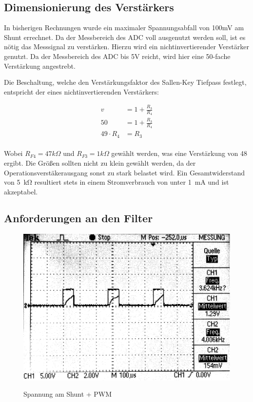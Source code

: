 \subsection{Dimensionierung des Verstärkers}

In bisherigen Rechnungen wurde ein maximaler Spannungsabfall von 100mV am Shunt errechnet. Da der Messbereich des ADC voll ausgenutzt werden soll,
ist es nötig das Messsignal zu verstärken. Hierzu wird ein nichtinvertierender Verstärker genutzt. Da der Messbereich des ADC bis 5V reicht, wird hier eine 
50-fache Verstärkung angestrebt.

Die Beschaltung, welche den Verstärkungsfaktor des Sallen-Key Tiefpass festlegt, entspricht der eines nichtinvertierenden Verstärkers:

\begin{align*}
v &= 1 + \frac{R_{3}}{R_{4}}\\
50 &= 1 + \frac{R_{3}}{R_{4}}\\
49\cdot R_{4} &= R_{3}
\end{align*}
\\
Wobei $R_{F4} = 47 k\Omega$ und $R_{F3} = 1 k\Omega$  gewählt werden, was eine Verstärkung von 48 ergibt. Die Größen sollten nicht zu klein gewählt werden, 
da der Operationsverstäkerausgang sonst zu stark belastet wird. Ein Gesamtwiderstand von \SI{5}{\kohm} resultiert stets in einem Stromverbrauch von unter \SI{1}{\mA} und ist
akzeptabel.


\subsection{Anforderungen an den Filter}

\begin{figure}[H]
\centering
\includegraphics[width=.8\textwidth]{oszi.png}\\
\caption{Spannung am Shunt + PWM}%
\label{fig:pwm+i}
\end{figure}

